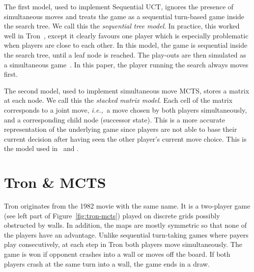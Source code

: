 \documentclass{article}
\newcommand{\ie}{{\it i.e.,}~}
\begin{document}
The first model, used to implement Sequential UCT, ignores the presence of simultaneous moves and treats the game as a sequential turn-based game inside the search tree. 
We call this the {\it sequential tree model}. 
In practice, this worked well in Tron~\cite{teuling_tron,tron_cig}, except it clearly favours one player which is especially problematic when players are close to each other. 
In this model, the game is sequential inside the search tree, until a leaf node is reached. The play-outs are then simulated as a simultaneous game~\cite{teuling_tron}. 
In this paper, the player running the search always moves first. 

The second model, used to implement simultaneous move MCTS, stores a matrix at each node. 
We call this the {\it stacked matrix model}.
Each cell of the matrix corresponds to a joint move, \ie a move chosen by both players simultaneously, and a corresponding child node (successor state). 
This is a more accurate representation of the underlying game since players are not able to base their current decision after having seen the other player's current move choice. 
This is the model used in~\cite{cig_paper} and \cite{mcts_goofspiel}.


\section{Tron \& MCTS}
\label{sec:tron_specific_mcts}

Tron originates from the 1982 movie with the same name. It is a two-player game (see left part of Figure~\ref{fig:tron-mcts}) played on discrete grids possibly obstructed by walls. In addition, the maps are mostly symmetric so that none of the players have an advantage. Unlike sequential turn-taking games where payers play consecutively, at each step in Tron both players move simultaneously. The game is won if opponent crashes into a wall or moves off the board. If both players crash at the same turn into a wall, the game ends in a draw.
\end{document}
